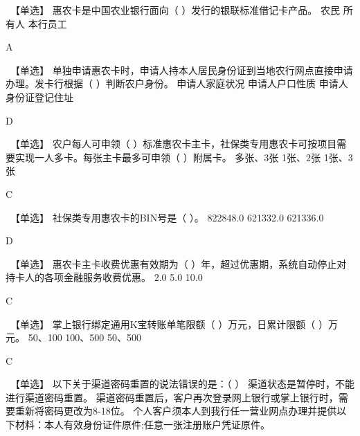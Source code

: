 \documentclass[kindlepaper]{BHCexam4kindle}
\begin{document}
\begin{questions}
\qs　【单选】 惠农卡是中国农业银行面向（   ）发行的银联标准借记卡产品。 \xx
{} {  农民 } { 所有人 } { 本行员工 }
\begin{solution} A \end{solution}
\qs　【单选】 单独申请惠农卡时，申请人持本人居民身份证到当地农行网点直接申请办理。发卡行根据（   ）判断农户身份。 \xx
{} {  申请人家庭状况 } { 申请人户口性质 } { 申请人身份证登记住址 }
\begin{solution} D \end{solution}
\qs　【单选】 农户每人可申领（   ）标准惠农卡主卡，社保类专用惠农卡可按项目需要实现一人多卡。每张主卡最多可申领（   ）附属卡。 \xx
{} {  多张、3张 } { 1张、2张 } { 1张、3张 }
\begin{solution} C \end{solution}
\qs　【单选】 社保类专用惠农卡的BIN号是（   ）。 \xx
{} {  822848.0 } { 621332.0 } { 621336.0 }
\begin{solution} D \end{solution}
\qs　【单选】 惠农卡主卡收费优惠有效期为（   ）年，超过优惠期，系统自动停止对持卡人的各项金融服务收费优惠。 \xx
{} {  2.0 } { 5.0 } { 10.0 }
\begin{solution} C \end{solution}
\qs　【单选】 掌上银行绑定通用K宝转账单笔限额（   ）万元，日累计限额（   ）万元。 \xx
{} {  50、100 } { 100、500 } { 50、500 }
\begin{solution} C \end{solution}
\qs　【单选】 以下关于渠道密码重置的说法错误的是：（   ） \xx
{} {  渠道状态是暂停时，不能进行渠道密码重置。 } { 渠道密码重置后，客户再次登录网上银行或掌上银行时，需要重新将密码更改为8-18位。 } { 个人客户须本人到我行任一营业网点办理并提供以下材料：本人有效身份证件原件;任意一张注册账户凭证原件。 }

\end{questions}
\end{document}
